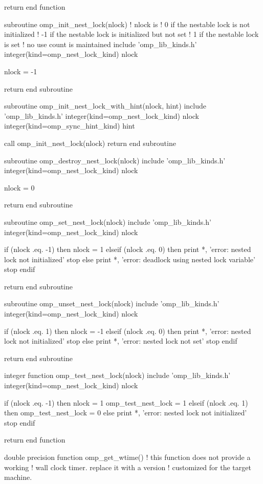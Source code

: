 {\begin{ompfFunction}
  return
end function

subroutine omp_init_nest_lock(nlock)
  ! nlock is
  ! 0 if the nestable lock is not initialized
  ! -1 if the nestable lock is initialized but not set
  ! 1 if the nestable lock is set
  ! no use count is maintained
  include 'omp_lib_kinds.h'
  integer(kind=omp_nest_lock_kind) nlock

  nlock = -1

  return
end subroutine

subroutine omp_init_nest_lock_with_hint(nlock, hint)
  include 'omp_lib_kinds.h'
  integer(kind=omp_nest_lock_kind) nlock
  integer(kind=omp_sync_hint_kind) hint

  call omp_init_nest_lock(nlock)
  return
end subroutine

subroutine omp_destroy_nest_lock(nlock)
  include 'omp_lib_kinds.h'
  integer(kind=omp_nest_lock_kind) nlock

  nlock = 0

  return
end subroutine

subroutine omp_set_nest_lock(nlock)
  include 'omp_lib_kinds.h'
  integer(kind=omp_nest_lock_kind) nlock

  if (nlock .eq. -1) then
    nlock = 1
  elseif (nlock .eq. 0) then
    print *, 'error: nested lock not initialized'
    stop
  else
    print *, 'error: deadlock using nested lock variable'
    stop
  endif

  return
end subroutine

subroutine omp_unset_nest_lock(nlock)
  include 'omp_lib_kinds.h'
  integer(kind=omp_nest_lock_kind) nlock

  if (nlock .eq. 1) then
    nlock = -1
  elseif (nlock .eq. 0) then
    print *, 'error: nested lock not initialized'
    stop
  else
    print *, 'error: nested lock not set'
    stop
  endif

  return
end subroutine

integer function omp_test_nest_lock(nlock)
  include 'omp_lib_kinds.h'
  integer(kind=omp_nest_lock_kind) nlock

  if (nlock .eq. -1) then
    nlock = 1
    omp_test_nest_lock = 1
  elseif (nlock .eq. 1) then
    omp_test_nest_lock = 0
  else
    print *, 'error: nested lock not initialized'
    stop
  endif

  return
end function

double precision function omp_get_wtime()
  ! this function does not provide a working
  ! wall clock timer. replace it with a version
  ! customized for the target machine.


\end{ompfFunction}}
